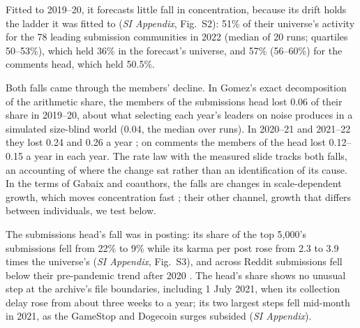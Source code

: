 \documentclass[9pt,twocolumn,twoside]{pnas-new}
\begin{document}
Fitted to 2019--20, it forecasts little fall in concentration, because its drift holds the ladder it was fitted to (\textit{SI Appendix}, Fig.~S2): 51\% of their universe's activity for the 78 leading submission communities in 2022 (median of 20 runs; quartiles 50--53\%), which held 36\% in the forecast's universe, and 57\% (56--60\%) for the comments head, which held 50.5\%.

Both falls came through the members' decline. In Gomez's exact decomposition of the arithmetic share, the members of the submissions head lost 0.06 of their share in 2019--20, about what selecting each year's leaders on noise produces in a simulated size-blind world (0.04, the median over runs). In 2020--21 and 2021--22 they lost 0.24 and 0.26 a year \cite{gomez2023}; on comments the members of the head lost 0.12--0.15 a year in each year. The rate law with the measured slide tracks both falls, an accounting of where the change sat rather than an identification of its cause. In the terms of Gabaix and coauthors, the falls are changes in scale-dependent growth, which moves concentration fast \cite{gllm2016}; their other channel, growth that differs between individuals, we test below.

The submissions head's fall was in posting: its share of the top 5,000's submissions fell from 22\% to 9\% while its karma per post rose from 2.3 to 3.9 times the universe's (\textit{SI Appendix}, Fig.~S3), and across Reddit submissions fell below their pre-pandemic trend after 2020 \cite{veselovsky2023}. The head's share shows no unusual step at the archive's file boundaries, including 1 July 2021, when its collection delay rose from about three weeks to a year; its two largest steps fell mid-month in 2021, as the GameStop and Dogecoin surges subsided (\textit{SI Appendix}).
\end{document}
